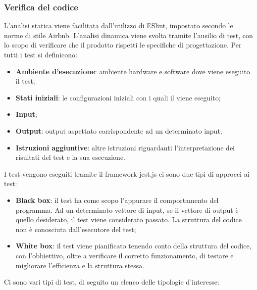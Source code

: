 	\subsubsection{Verifica del codice}
	L'analisi statica viene facilitata dall'utilizzo di ESlint, impostato secondo le norme di stile Airbnb.
	L'analisi dinamica viene svolta tramite l'ausilio di test, con lo scopo di verificare che il prodotto rispetti le specifiche di progettazione.
	Per tutti i test si definicono:
	\begin{itemize}
	    \item \textbf{Ambiente d'esecuzione}: ambiente hardware e software dove viene eseguito il test;
	    \item \textbf{Stati iniziali}: le configurazioni iniziali con i quali il viene eseguito;
	    \item \textbf{Input};
	    \item \textbf{Output}: output aspettato corrispondente ad un determinato input;
	    \item \textbf{Istruzioni aggiuntive}: altre istruzioni riguardanti l'interpretazione dei risultati del test e la sua esecuzione.
	\end{itemize}
	I test vengono eseguiti tramite il framework jest.js
	ci sono due tipi di approcci ai test:
	\begin{itemize}
	    \item \textbf{Black box}: il test ha come scopo l'appurare il comportamento del programma. Ad un determinato vettore di input, se il vettore di output è quello desiderato, il test viene considerato passato. La struttura del codice non è conosciuta dall'esecutore del test; 
	    \item \textbf{White box}: il test viene pianificato tenendo conto della struttura del codice, con l'obbiettivo, oltre a verificare il corretto funzionamento, di testare e migliorare l'efficienza e la struttura stessa. 
	\end{itemize}
	Ci sono vari tipi di test, di seguito un elenco delle tipologie d'interesse:
